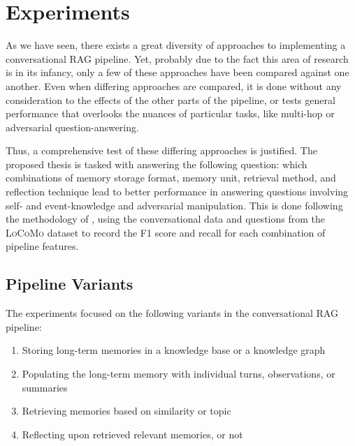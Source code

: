 \section{Experiments}

As we have seen, there exists a great diversity of approaches to implementing a conversational RAG pipeline. Yet, probably due to the fact this area of research is in its infancy, only a few of these approaches have been compared against one another. Even when differing approaches are compared, it is done without any consideration to the effects of the other parts of the pipeline, or tests general performance that overlooks the nuances of particular tasks, like multi-hop or adversarial question-answering.

	Thus, a comprehensive test of these differing approaches is justified. The proposed thesis is tasked with answering the following question: which combinations of memory storage format, memory unit, retrieval method, and reflection technique lead to better performance in answering questions involving self- and event-knowledge and adversarial manipulation. This is done following the methodology of \cite{Maharana2024}, using the conversational data and questions from the \textsc{LoCoMo} dataset to record the F1 score and recall for each combination of pipeline features. 
	
	

\subsection{Pipeline Variants}
	
The experiments focused on the following variants in the conversational RAG pipeline: 
	
\begin{enumerate}
  \item Storing long-term memories in a knowledge base or a knowledge graph
  
  \item Populating the long-term memory with individual turns, observations, or summaries
  
  \item Retrieving memories based on similarity or topic
  
  \item Reflecting upon retrieved relevant memories, or not 
\end{enumerate}
	
